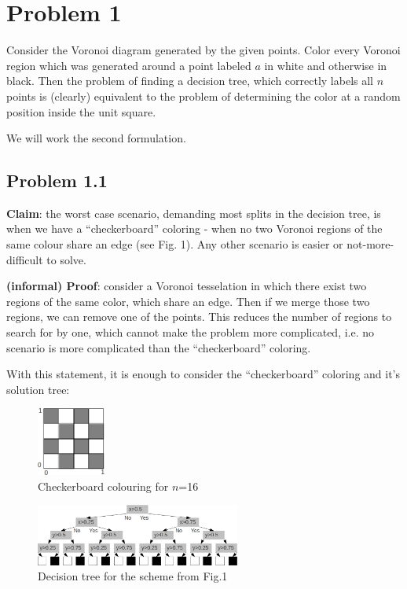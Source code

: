 \section*{Problem 1}

Consider the Voronoi diagram generated by the given points. Color every Voronoi region which was generated around a point labeled $a$ in white and otherwise in black. Then the problem of finding a decision tree, which correctly labels all $n$ points is (clearly) equivalent to the problem of determining the color at a random position inside the unit square.

We will work the second formulation.

\subsection*{Problem 1.1}

\textbf{Claim}: the worst case scenario, demanding most splits in the decision tree, is when we have a ``checkerboard'' coloring - when no two Voronoi regions of the same colour share an edge (see Fig. 1). Any other scenario is easier or not-more-difficult to solve.

\textbf{(informal) Proof}: consider a Voronoi tesselation in which there exist two regions of the same color, which share an edge. Then if we merge those two regions, we can remove one of the points. This reduces the number of regions to search for by one, which cannot make the problem more complicated, i.e. no scenario is more complicated than the ``checkerboard'' coloring.

With this statement, it is enough to consider the ``checkerboard'' coloring and it's solution tree:

\begin{figure}[!h]
  \begin{center}
    \includegraphics[width=0.2\textwidth]{plots/1_1.png}
    \caption{Checkerboard colouring for $n$=16}
  \end{center}
\end{figure}


\begin{figure}[!ht]
  \begin{center}
    \includegraphics[width=0.60\textwidth]{plots/1_2.png}
    \caption{Decision tree for the scheme from Fig.1}
  \end{center}
\end{figure}


